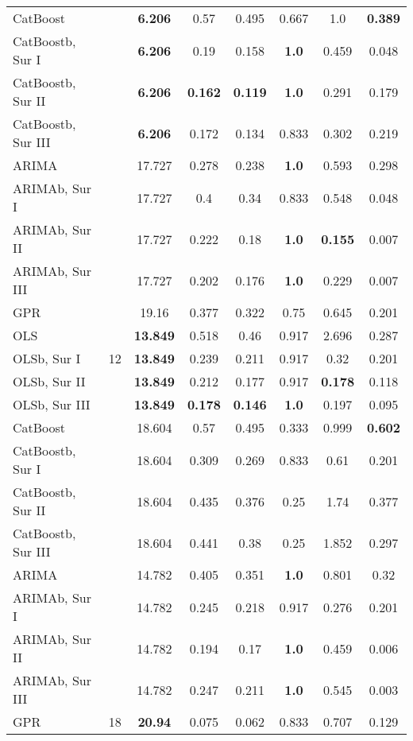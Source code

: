 \begin{longtable}[ht]{|l|c|c|c|c|c|c|c|}
CatBoost &   & \textbf{6.206} & 0.57 & 0.495 & 0.667 & 1.0 & \textbf{0.389} \\
CatBoostb, Sur I &   & \textbf{6.206} & 0.19 & 0.158 & \textbf{1.0} & 0.459 & 0.048 \\
CatBoostb, Sur II &   & \textbf{6.206} & \textbf{0.162} & \textbf{0.119} & \textbf{1.0} & 0.291 & 0.179 \\
CatBoostb, Sur III &   & \textbf{6.206} & 0.172 & 0.134 & 0.833 & 0.302 & 0.219 \\
ARIMA &   & 17.727 & 0.278 & 0.238 & \textbf{1.0} & 0.593 & 0.298 \\
ARIMAb, Sur I &   & 17.727 & 0.4 & 0.34 & 0.833 & 0.548 & 0.048 \\
ARIMAb, Sur II &   & 17.727 & 0.222 & 0.18 & \textbf{1.0} & \textbf{0.155} & 0.007 \\
ARIMAb, Sur III &   & 17.727 & 0.202 & 0.176 & \textbf{1.0} & 0.229 & 0.007 \\
\hline
GPR & \multirow{5}{*}{12} & 19.16 & 0.377 & 0.322 & 0.75 & 0.645 & 0.201 \\
OLS &   & \textbf{13.849} & 0.518 & 0.46 & 0.917 & 2.696 & 0.287 \\
OLSb, Sur I &   & \textbf{13.849} & 0.239 & 0.211 & 0.917 & 0.32 & 0.201 \\
OLSb, Sur II &   & \textbf{13.849} & 0.212 & 0.177 & 0.917 & \textbf{0.178} & 0.118 \\
OLSb, Sur III &   & \textbf{13.849} & \textbf{0.178} & \textbf{0.146} & \textbf{1.0} & 0.197 & 0.095 \\
CatBoost &   & 18.604 & 0.57 & 0.495 & 0.333 & 0.999 & \textbf{0.602} \\
CatBoostb, Sur I &   & 18.604 & 0.309 & 0.269 & 0.833 & 0.61 & 0.201 \\
CatBoostb, Sur II &   & 18.604 & 0.435 & 0.376 & 0.25 & 1.74 & 0.377 \\
CatBoostb, Sur III &   & 18.604 & 0.441 & 0.38 & 0.25 & 1.852 & 0.297 \\
ARIMA &   & 14.782 & 0.405 & 0.351 & \textbf{1.0} & 0.801 & 0.32 \\
ARIMAb, Sur I &   & 14.782 & 0.245 & 0.218 & 0.917 & 0.276 & 0.201 \\
ARIMAb, Sur II &   & 14.782 & 0.194 & 0.17 & \textbf{1.0} & 0.459 & 0.006 \\
ARIMAb, Sur III &   & 14.782 & 0.247 & 0.211 & \textbf{1.0} & 0.545 & 0.003 \\
\hline
GPR & \multirow{5}{*}{18} & \textbf{20.94} & 0.075 & 0.062 & 0.833 & 0.707 & 0.129 \\

\end{longtable}
